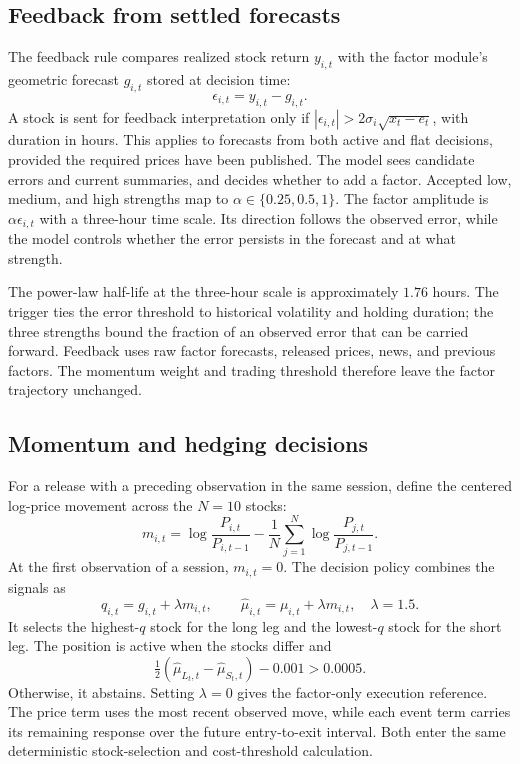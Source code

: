 \documentclass[conference]{IEEEtran}
\begin{document}
\subsection{Feedback from settled forecasts}
The feedback rule compares realized stock return $y_{i,t}$ with the factor module's geometric forecast $g_{i,t}$ stored at decision time:
\begin{equation}
 \epsilon_{i,t}=y_{i,t}-g_{i,t}.
\end{equation}
A stock is sent for feedback interpretation only if
$|\epsilon_{i,t}|>2\sigma_i\sqrt{x_t-e_t}$, with duration in hours. This applies to forecasts from both active and flat decisions, provided the required prices have been published. The model sees candidate errors and current summaries, and decides whether to add a factor. Accepted low, medium, and high strengths map to $\alpha\in\{0.25,0.5,1\}$. The factor amplitude is $\alpha\epsilon_{i,t}$ with a three-hour time scale. Its direction follows the observed error, while the model controls whether the error persists in the forecast and at what strength.

The power-law half-life at the three-hour scale is approximately $1.76$ hours. The trigger ties the error threshold to historical volatility and holding duration; the three strengths bound the fraction of an observed error that can be carried forward. Feedback uses raw factor forecasts, released prices, news, and previous factors. The momentum weight and trading threshold therefore leave the factor trajectory unchanged.

\subsection{Momentum and hedging decisions}
For a release with a preceding observation in the same session, define the centered log-price movement across the $N=10$ stocks:
\begin{equation}
 m_{i,t}=\log\frac{P_{i,t}}{P_{i,t-1}}-
 \frac{1}{N}\sum_{j=1}^{N}\log\frac{P_{j,t}}{P_{j,t-1}}.
\end{equation}
At the first observation of a session, $m_{i,t}=0$. The decision policy combines the signals as
\begin{equation}
 q_{i,t}=g_{i,t}+\lambda m_{i,t},\qquad
 \widehat\mu_{i,t}=\mu_{i,t}+\lambda m_{i,t},\quad \lambda=1.5.
\end{equation}
It selects the highest-$q$ stock for the long leg and the lowest-$q$ stock for the short leg. The position is active when the stocks differ and
\begin{equation}
 \tfrac12(\widehat\mu_{L_t,t}-\widehat\mu_{S_t,t})-0.001>0.0005.
\end{equation}
Otherwise, it abstains. Setting $\lambda=0$ gives the factor-only execution reference. The price term uses the most recent observed move, while each event term carries its remaining response over the future entry-to-exit interval. Both enter the same deterministic stock-selection and cost-threshold calculation.
\end{document}
